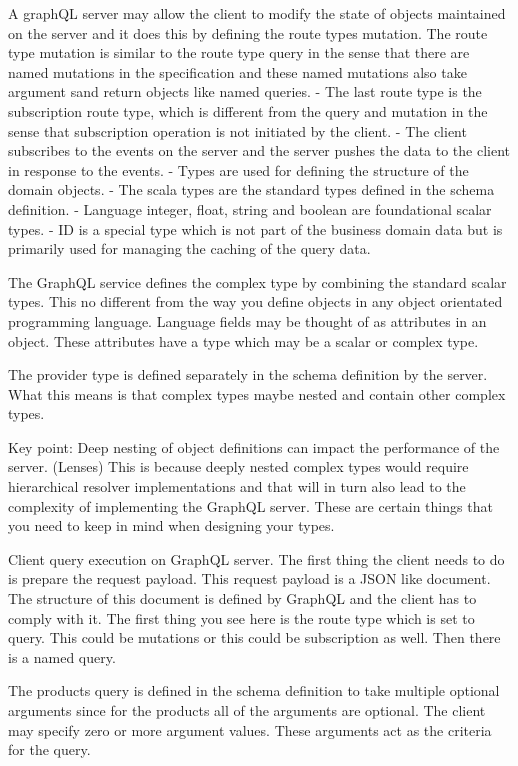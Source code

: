 A graphQL server may allow the client to modify the state of objects maintained on the server and it does this by defining the route types mutation.
The route type mutation is similar to the route type query in the sense that there are named mutations in the specification and these named mutations also take argument sand return objects like named queries.
- The last route type is the subscription route type, which is different from the query and mutation in the sense that subscription operation is not initiated by the client.
- The client subscribes to the events on the server and the server pushes the data to the client in response to the events.
- Types are used for defining the structure of the domain objects.
- The scala types are the standard types defined in the schema definition.
- Language integer, float, string and boolean are foundational scalar types.
- ID is a special type which is not part of the business domain data but is primarily used for managing the caching of the query data.

The GraphQL service defines the complex type by combining the standard scalar types.
This no different from the way you define objects in any object orientated programming language.
Language fields may be thought of as attributes in an object.
These attributes have a type which may be a scalar or complex type.


The provider type is defined separately in the schema definition by the server.
What this means is that complex types maybe nested and contain other complex types.

Key point: Deep nesting of object definitions can impact the performance of the server. (Lenses)
This is because deeply nested complex types would require hierarchical resolver implementations and that will in turn also lead to the complexity of implementing the GraphQL server.
These are certain things that you need to keep in mind when designing your types.

Client query execution on GraphQL server.
The first thing the client needs to do is prepare the request payload.
This request payload is a JSON like document.
The structure of this document is defined by GraphQL and the client has to comply with it.
The first thing you see here is the route type which is set to query.
This could be mutations or this could be subscription as well.
Then there is a named query.

The products query is defined in the schema definition to take multiple optional arguments since for the products all of the arguments are optional.
The client may specify zero or more argument values.
These arguments act as the criteria for the query.

